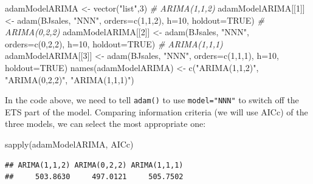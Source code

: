 \documentclass[
]{book}
\newenvironment{Shaded}{\begin{snugshade}}{\end{snugshade}}
\newcommand{\AttributeTok}[1]{\textcolor[rgb]{0.77,0.63,0.00}{#1}}
\newcommand{\CommentTok}[1]{\textcolor[rgb]{0.56,0.35,0.01}{\textit{#1}}}
\newcommand{\ConstantTok}[1]{\textcolor[rgb]{0.00,0.00,0.00}{#1}}
\newcommand{\DecValTok}[1]{\textcolor[rgb]{0.00,0.00,0.81}{#1}}
\newcommand{\FunctionTok}[1]{\textcolor[rgb]{0.00,0.00,0.00}{#1}}
\newcommand{\NormalTok}[1]{#1}
\newcommand{\OtherTok}[1]{\textcolor[rgb]{0.56,0.35,0.01}{#1}}
\newcommand{\StringTok}[1]{\textcolor[rgb]{0.31,0.60,0.02}{#1}}
\theoremstyle{definition}
\theoremstyle{definition}
\theoremstyle{definition}
\theoremstyle{definition}
\theoremstyle{remark}
\begin{document}
\begin{Shaded}
\begin{Highlighting}[]
\NormalTok{adamModelARIMA }\OtherTok{\textless{}{-}} \FunctionTok{vector}\NormalTok{(}\StringTok{"list"}\NormalTok{,}\DecValTok{3}\NormalTok{)}
\CommentTok{\# ARIMA(1,1,2)}
\NormalTok{adamModelARIMA[[}\DecValTok{1}\NormalTok{]] }\OtherTok{\textless{}{-}} \FunctionTok{adam}\NormalTok{(BJsales, }\StringTok{"NNN"}\NormalTok{, }\AttributeTok{orders=}\FunctionTok{c}\NormalTok{(}\DecValTok{1}\NormalTok{,}\DecValTok{1}\NormalTok{,}\DecValTok{2}\NormalTok{),}
                            \AttributeTok{h=}\DecValTok{10}\NormalTok{, }\AttributeTok{holdout=}\ConstantTok{TRUE}\NormalTok{)}
\CommentTok{\# ARIMA(0,2,2)}
\NormalTok{adamModelARIMA[[}\DecValTok{2}\NormalTok{]] }\OtherTok{\textless{}{-}} \FunctionTok{adam}\NormalTok{(BJsales, }\StringTok{"NNN"}\NormalTok{, }\AttributeTok{orders=}\FunctionTok{c}\NormalTok{(}\DecValTok{0}\NormalTok{,}\DecValTok{2}\NormalTok{,}\DecValTok{2}\NormalTok{),}
                            \AttributeTok{h=}\DecValTok{10}\NormalTok{, }\AttributeTok{holdout=}\ConstantTok{TRUE}\NormalTok{)}
\CommentTok{\# ARIMA(1,1,1)}
\NormalTok{adamModelARIMA[[}\DecValTok{3}\NormalTok{]] }\OtherTok{\textless{}{-}} \FunctionTok{adam}\NormalTok{(BJsales, }\StringTok{"NNN"}\NormalTok{, }\AttributeTok{orders=}\FunctionTok{c}\NormalTok{(}\DecValTok{1}\NormalTok{,}\DecValTok{1}\NormalTok{,}\DecValTok{1}\NormalTok{),}
                            \AttributeTok{h=}\DecValTok{10}\NormalTok{, }\AttributeTok{holdout=}\ConstantTok{TRUE}\NormalTok{)}
\FunctionTok{names}\NormalTok{(adamModelARIMA) }\OtherTok{\textless{}{-}} \FunctionTok{c}\NormalTok{(}\StringTok{"ARIMA(1,1,2)"}\NormalTok{, }\StringTok{"ARIMA(0,2,2)"}\NormalTok{,}
                           \StringTok{"ARIMA(1,1,1)"}\NormalTok{)}
\end{Highlighting}
\end{Shaded}

In the code above, we need to tell \texttt{adam()} to use \texttt{model="NNN"} to switch off the ETS part of the model. Comparing information criteria (we will use AICc) of the three models, we can select the most appropriate one:

\begin{Shaded}
\begin{Highlighting}[]
\FunctionTok{sapply}\NormalTok{(adamModelARIMA, AICc)}
\end{Highlighting}
\end{Shaded}

\begin{verbatim}
## ARIMA(1,1,2) ARIMA(0,2,2) ARIMA(1,1,1) 
##     503.8630     497.0121     505.7502
\end{verbatim}
\end{document}
